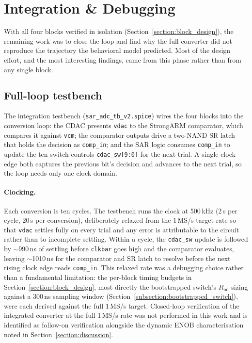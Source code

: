 \documentclass[12pt, a4paper]{article}
\begin{document}
\section{Integration \& Debugging}
\label{section:integration}

With all four blocks verified in isolation (Section~\ref{section:block_design}),
the remaining work was to close the loop and find why the full converter
did not reproduce the trajectory the behavioral model predicted. Most of
the design effort, and the most interesting findings, came from this
phase rather than from any single block.

\subsection{Full-loop testbench}
\label{subsection:tb}

The integration testbench (\texttt{sar\_adc\_tb\_v2.spice}) wires the four
blocks into the conversion loop: the CDAC presents \texttt{vdac} to the
StrongARM comparator, which compares it against \texttt{vcm}; the
comparator outputs drive a two-NAND SR latch that holds the decision as
\texttt{comp\_in}; and the SAR logic consumes \texttt{comp\_in} to update
the ten switch controls \texttt{cdac\_sw[9:0]} for the next trial. A single
clock edge both captures the previous bit's decision and advances to the
next trial, so the loop needs only one clock domain.

\paragraph{Clocking.} Each conversion is ten cycles. The testbench runs
the clock at 500\,kHz (2\,\textmu s per cycle, 20\,\textmu s per
conversion), deliberately relaxed from the 1\,MS/s target rate so that
\texttt{vdac} settles fully on every trial and any error is attributable
to the circuit rather than to incomplete settling. Within a cycle, the
\texttt{cdac\_sw} update is followed by $\sim$990\,ns of settling before
\texttt{clkbar} goes high and the comparator evaluates, leaving
$\sim$1010\,ns for the comparator and SR latch to resolve before the next
rising clock edge reads \texttt{comp\_in}. This relaxed rate was a debugging choice rather than a fundamental limitation: the per-block timing budgets in Section~\ref{section:block_design}, most directly the bootstrapped switch's $R_\mathrm{on}$ sizing against a 300\,ns sampling window (Section~\ref{subsection:bootstrapped_switch}), were each derived against the full 1\,MS/s target. Closed-loop verification of the integrated converter at the full 1\,MS/s rate was not performed in this work and is identified as follow-on verification alongside the dynamic ENOB characterisation noted in Section~\ref{section:discussion}.
\end{document}
